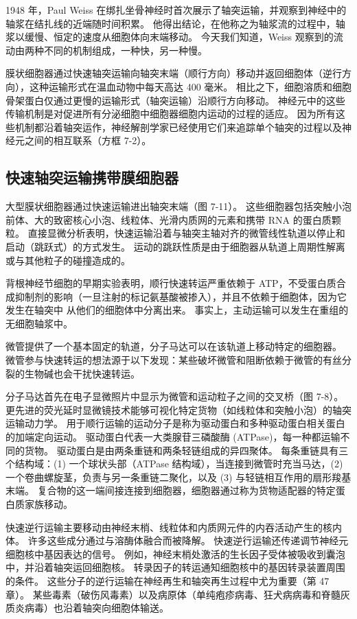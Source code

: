 1948 年，Paul Weiss 在绑扎坐骨神经时首次展示了轴突运输，并观察到神经中的轴浆在结扎线的近端随时间积累。 他得出结论，在他称之为轴浆流的过程中，轴浆以缓慢、恒定的速度从细胞体向末端移动。 今天我们知道，Weiss 观察到的流动由两种不同的机制组成，一种快，另一种慢。

膜状细胞器通过快速轴突运输向轴突末端（顺行方向）移动并返回细胞体（逆行方向），这种运输形式在温血动物中每天高达 400 毫米。 相比之下，细胞溶质和细胞骨架蛋白仅通过更慢的运输形式（轴突运输）沿顺行方向移动。 神经元中的这些传输机制是对促进所有分泌细胞中细胞器细胞内运动的过程的适应。 因为所有这些机制都沿着轴突运作，神经解剖学家已经使用它们来追踪单个轴突的过程以及神经元之间的相互联系（方框 7-2）。

\subsection{快速轴突运输携带膜细胞器}

大型膜状细胞器通过快速运输进出轴突末端（图 7-11）。 这些细胞器包括突触小泡前体、大的致密核心小泡、线粒体、光滑内质网的元素和携带 RNA 的蛋白质颗粒。 直接显微分析表明，快速运输沿着与轴突主轴对齐的微管线性轨道以停止和启动（跳跃式）的方式发生。 运动的跳跃性质是由于细胞器从轨道上周期性解离或与其他粒子的碰撞造成的。

背根神经节细胞的早期实验表明，顺行快速转运严重依赖于 ATP，不受蛋白质合成抑制剂的影响（一旦注射的标记氨基酸被掺入），并且不依赖于细胞体，因为它发生在轴突中 从他们的细胞体中分离出来。 事实上，主动运输可以发生在重组的无细胞轴浆中。

微管提供了一个基本固定的轨道，分子马达可以在该轨道上移动特定的细胞器。 微管参与快速转运的想法源于以下发现：某些破坏微管和阻断依赖于微管的有丝分裂的生物碱也会干扰快速转运。

分子马达首先在电子显微照片中显示为微管和运动粒子之间的交叉桥（图 7-8）。 更先进的荧光延时显微镜技术能够可视化特定货物（如线粒体和突触小泡）的轴突运输动力学。 用于顺行运输的运动分子是称为驱动蛋白和多种驱动蛋白相关蛋白的加端定向运动。 驱动蛋白代表一大类腺苷三磷酸酶 (ATPase)，每一种都运输不同的货物。 驱动蛋白是由两条重链和两条轻链组成的异四聚体。 每条重链具有三个结构域：(1) 一个球状头部（ATPase 结构域），当连接到微管时充当马达，(2) 一个卷曲螺旋茎，负责与另一条重链二聚化，以及 (3) 与轻链相互作用的扇形羧基末端。 复合物的这一端间接连接到细胞器，细胞器通过称为货物适配器的特定蛋白质家族移动。

快速逆行运输主要移动由神经末梢、线粒体和内质网元件的内吞活动产生的核内体。 许多这些成分通过与溶酶体融合而被降解。 快速逆行运输还传递调节神经元细胞核中基因表达的信号。 例如，神经末梢处激活的生长因子受体被吸收到囊泡中，并沿着轴突运回细胞核。 转录因子的转运通知细胞核中的基因转录装置周围的条件。 这些分子的逆行运输在神经再生和轴突再生过程中尤为重要（第 47 章）。 某些毒素（破伤风毒素）以及病原体（单纯疱疹病毒、狂犬病病毒和脊髓灰质炎病毒）也沿着轴突向细胞体输送。

